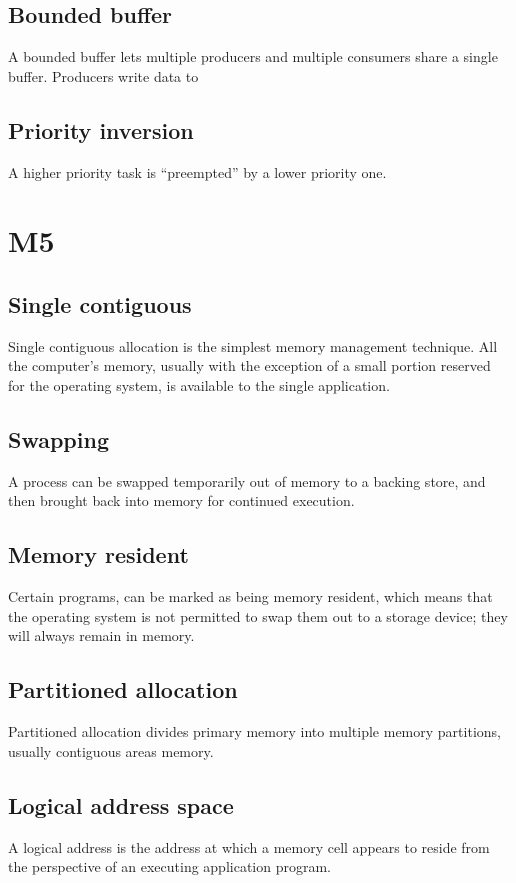 \subsection{Bounded buffer}
A bounded buffer lets multiple producers and multiple
consumers share a single buffer. Producers write data to

\subsection{Priority inversion}
A higher priority task is “preempted” by a lower priority one.

\section{M5}
\subsection{Single contiguous}
Single contiguous allocation is the simplest
memory management technique. All the
computer's memory, usually with the
exception of a small portion reserved for
the operating system, is available to the
single application.

\subsection{Swapping}
A process can be swapped temporarily
out of memory to a backing store, and
then brought back into memory for continued execution.

\subsection{Memory resident}
Certain programs, can be marked as being
memory resident, which means that the operating
system is not permitted to swap them out to a
storage device; they will always remain in
memory.

\subsection{Partitioned allocation}
Partitioned allocation divides primary memory into multiple memory
partitions, usually contiguous areas memory.

\subsection{Logical address space}
A logical address is the address at which
a memory cell appears to reside from the perspective of an
executing application program.

